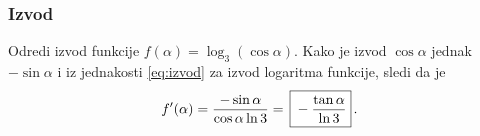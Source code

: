 \subsubsection{Izvod}
\zadatak Odredi izvod funkcije $f(\alpha)=\log_3(\cos\alpha)$.
\resenje Kako je izvod $\cos\alpha$ jednak $-\sin\alpha$ i iz jednakosti 
\eqref{eq:izvod} za izvod logaritma funkcije, sledi da je
$$
f'(\alpha)
=\frac{-\sin\alpha}{\cos\alpha\ln3}
=\ram{-\frac{\tan\alpha}{\ln3}}.
$$
